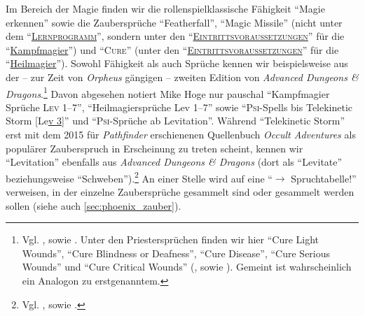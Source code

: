 \documentclass[a5paper,pagesize,numbers=noenddot]{scrbook}
\begin{document}
Im Bereich der Magie finden wir die rollenspielklassische Fähigkeit \enquote{Magie erkennen}\autocite[S.~2, 7]{orpheus_gildensystem} sowie die Zaubersprüche \enquote{Featherfall}\autocite[S.~9]{orpheus_gildensystem}, \enquote{Magic Missile} (nicht unter dem \enquote{\textsc{\uline{Lernprogramm}}}, sondern unter den \enquote{\textsc{\uline{Eintrittsvoraussetzun\-gen}}} für die \enquote{\uline{Kampfmagier}})\autocite[S.~2]{orpheus_gildensystem} und \enquote{\textsc{Cure}} (unter den \enquote{\textsc{\uline{Eintrittsvoraus\-setzungen}}} für die \enquote{\uline{Heilmagier}}).\autocite[S.~7]{orpheus_gildensystem}
Sowohl Fähigkeit als auch Sprüche kennen wir beispielsweise aus der -- zur Zeit von \textit{Orpheus} gängigen -- zweiten Edition von \textit{Advanced Dungeons \& Dragons}.\footnote{Vgl. \autocite[S.~133, 134, 136]{cook_adnd_1989}, sowie \autocite[S.~171, 173]{cook_adnd_1996}. Unter den Priestersprüchen finden wir hier \enquote{Cure Light Wounds}, \enquote{Cure Blindness or Deafness}, \enquote{Cure Disease}, \enquote{Cure Serious Wounds} und \enquote{Cure Critical Wounds} (\autocite[S.~199, 209\,f., 217, 222]{cook_adnd_1989}, sowie \autocite[S.~249, 261\,f., 264\,f., 272\,f., 278]{cook_adnd_1996}). Gemeint ist wahrscheinlich ein Analogon zu erstgenanntem.} %
Davon abgesehen notiert Mike Hoge nur pauschal \enquote{Kampfmagier Sprüche \textsc{Lev} 1--7},\autocite[S.~2]{orpheus_gildensystem} \enquote{Heilmagiersprüche Lev 1--7}\autocite[S.~7]{orpheus_gildensystem} sowie \enquote{\textsc{Psi}-Spells bis Telekinetic Storm [Le\uline{v 3}]}\autocite[S.~10]{orpheus_gildensystem} und \enquote{\textsc{Psi}-Sprüche ab Levitation}.\autocite[S.~11]{orpheus_gildensystem}
Während \enquote{Telekinetic Storm} erst mit dem 2015 für \textit{Pathfinder} erschienenen Quellenbuch \textit{Occult Adventures} als populärer Zauberspruch in Erscheinung zu treten scheint,\autocite[Vgl.][S.~188]{bulmahn_pathfinder_2015} kennen wir \enquote{Levitation} ebenfalls aus \textit{Advanced Dungeons \& Dragons} (dort als \enquote{Levitate} beziehungsweise \enquote{Schweben}).\footnote{Vgl. \autocite[S.~143]{cook_adnd_1989}, sowie \autocite[S.~186]{cook_adnd_1996}.} %
An einer Stelle wird auf eine \enquote{$\rightarrow$ Spruchtabelle!}\autocite[S.~10]{orpheus_gildensystem} verweisen, in der einzelne Zaubersprüche gesammelt sind oder gesammelt werden sollen (siehe auch \autoref{sec:phoenix_zauber}).
\end{document}
